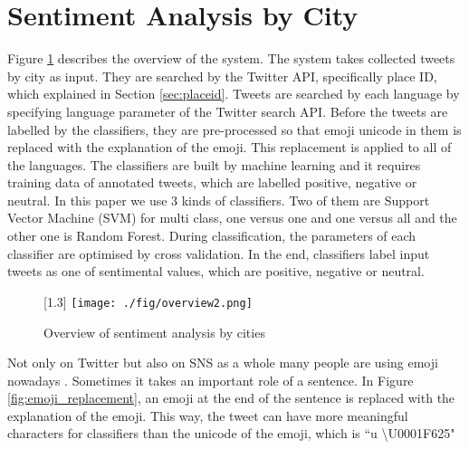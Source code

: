 \documentclass[twocolumn]{article}
\begin{document}
\vspace{-6mm}

\section{Sentiment Analysis by City}\label{sec:overview}
\vspace{-2mm}
Figure \ref{fig:overview} describes the overview of the system.
The system takes collected tweets by city as input.
They are searched by the Twitter API, specifically place ID, which explained in Section \ref{sec:placeid}.
Tweets are searched by each language by specifying language parameter of the Twitter search API.
Before the tweets are labelled by the classifiers, they are pre-processed so that emoji unicode in them is replaced with the explanation of the emoji.
This replacement is applied to all of the languages.
The classifiers are built by machine learning and it requires training data of annotated tweets, which are labelled positive, negative or neutral.
In this paper we use 3 kinds of classifiers.
Two of them are Support Vector Machine (SVM) for multi class, one versus one and one versus all and the other one is Random Forest.
During classification, the parameters of each classifier are optimised by cross validation.
In the end, classifiers label input tweets as one of sentimental values, which are positive, negative or neutral.

\begin{figure}
	\centering
	\scalebox{1.2}[1.3]{
	\texttt{[image: ./fig/overview2.png]}
	}
	\caption{Overview of sentiment analysis by cities}
	\label{fig:overview}
\end{figure}

Not only on Twitter but also on SNS as a whole many people are using emoji nowadays \cite{emoji}.
Sometimes it takes an important role of a sentence.
In Figure \ref{fig:emoji_replacement}, an emoji at the end of the sentence is replaced with the explanation of the emoji.
This way, the tweet can have more meaningful characters for classifiers than the unicode of the emoji, which is ``u \textbackslash U0001F625"
\end{document}
